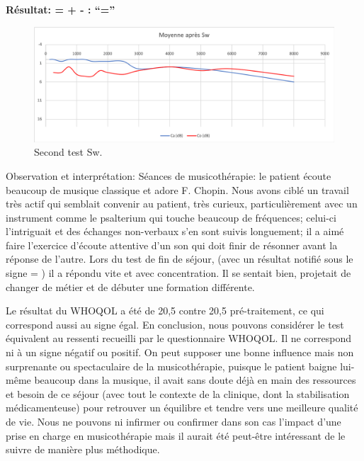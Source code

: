                 \textbf{ Résultat:  = +  -        : ``=''}

                \begin{figure}[th]
\centering
\includegraphics[width=0.7\linewidth]{images/graphiques/sw_post.png}
\caption[Patient Sw.: 2° test]{Second test Sw.}

\end{figure}

 Observation et interprétation:  Séances de musicothérapie: 
 le patient écoute beaucoup de musique classique et adore F. Chopin.
 Nous avons ciblé un travail très actif qui semblait convenir au patient, très curieux, particulièrement avec 
 un 
 instrument comme le psalterium qui touche beaucoup de fréquences; celui-ci l'intriguait et 
 des échanges non-verbaux s'en sont suivis longuement; il a aimé faire  l'exercice d'écoute attentive 
 d'un 
 son qui doit finir de résonner avant la réponse de l'autre. 
Lors du test de fin de séjour, (avec un résultat notifié sous le signe = ) il a répondu vite et avec 
concentration. Il se sentait bien, 
projetait  de changer de métier et de débuter une formation différente.


Le résultat du WHOQOL a été de 20,5 contre 20,5 pré-traitement, ce qui
correspond aussi au signe égal.
En conclusion, nous pouvons considérer le test équivalent au ressenti recueilli par le questionnaire 
WHOQOL. 
Il ne correspond ni à un signe négatif ou positif. On peut supposer une bonne influence mais non 
surprenante ou spectaculaire de la musicothérapie, puisque le patient baigne lui-même beaucoup dans 
la musique, il avait sans doute déjà en main des ressources et  
besoin de ce séjour (avec tout le contexte de la clinique, dont la stabilisation médicamenteuse) pour 
retrouver un équilibre et tendre vers une meilleure qualité de vie. 
Nous ne pouvons ni infirmer ou confirmer dans son cas l'impact d'une prise en charge en  
musicothérapie mais il aurait été  peut-être 
intéressant de le suivre de manière plus méthodique. 

